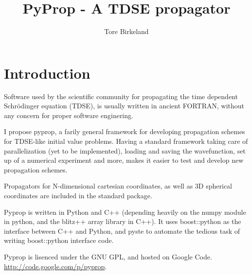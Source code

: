 \documentclass[a4paper,12pt]{report}
\title{PyProp - A TDSE propagator}
\author{Tore Birkeland}
\begin{document}
\maketitle

\chapter{Introduction}
Software used by the scientific community for propagating the time dependent Schrödinger equation (TDSE), 
is usually written in ancient FORTRAN, without any concern for proper software enginering.

I propose pyprop, a farily general framework for developing propagation schemes for TDSE-like 
initial value problems. Having a standard framework taking care of parallelization (yet to be implemented), 
loading and saving the wavefunction, set up of a numerical experiment and more, makes it easier to test 
and develop new propagation schemes. 

Propagators for N-dimensional cartesian coordinates, as well as 3D spherical coordinates are included 
in the standard package.

Pyprop is written in Python and C++ (depending heavily on the numpy module in python, and the
blitz++ array library in C++). It uses boost::python as the interface between C++ and Python, 
and pyste to automate the tedious task of writing boost::python interface code.

Pyprop is lisenced under the GNU GPL, and hosted on Google Code. 
\url{http://code.google.com/p/pyprop}.






\end{document}
